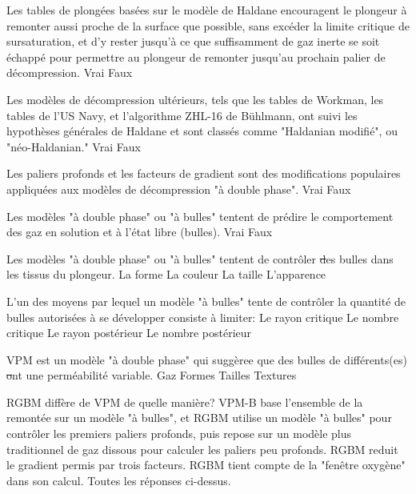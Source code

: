 \documentclass[english,10pt,a4paper,twoside]{article}
\begin{document}
	\begin{outline}

		\1 Les tables de plongées basées sur le modèle de Haldane encouragent le plongeur à remonter aussi proche de la surface que possible, sans excéder la limite critique de sursaturation, et d'y rester jusqu'à ce que suffisamment de gaz inerte se soit échappé pour permettre au plongeur de remonter jusqu'au prochain palier de décompression.
			\2 Vrai
			\2 Faux

		\1 Les modèles de décompression ultérieurs, tels que les tables de Workman, les tables de l'US Navy, et l'algorithme ZHL-16 de Bühlmann, ont suivi les hypothèses générales de Haldane et sont classés comme "Haldanian modifié", ou "néo-Haldanian."
			\2 Vrai
			\2 Faux

		\1 Les paliers profonds et les facteurs de gradient sont des modifications populaires appliquées aux modèles de décompression "à double phase".
			\2 Vrai
			\2 Faux

		\1 Les modèles "à double phase" ou "à bulles" tentent de prédire le comportement des gaz en solution et à l'état libre (bulles).
			\2 Vrai
			\2 Faux

		\1 Les modèles "à double phase" ou "à bulles" tentent de contrôler \st des bulles dans les tissus du plongeur.
			\2 La forme
			\2 La couleur
			\2 La taille
			\2 L'apparence

		\1 L'un des moyens par lequel un modèle "à bulles" tente de contrôler la quantité de bulles autorisées à se développer consiste à limiter:
			\2 Le rayon critique
			\2 Le nombre critique
			\2 Le rayon postérieur
			\2 Le nombre postérieur

		\1 VPM est un modèle "à double phase" qui suggèree que des bulles de différents(es) \st ont une perméabilité variable.
			\2 Gaz
			\2 Formes
			\2 Tailles
			\2 Textures

		\1 RGBM diffère de VPM de quelle manière?
			\2 VPM-B base l'ensemble de la remontée sur un modèle "à bulles", et RGBM utilise un modèle "à bulles" pour contrôler les premiers paliers profonds, puis repose sur un modèle plus traditionnel de gaz dissous pour calculer les paliers peu profonds.
			\2 RGBM reduit le gradient permis par trois facteurs.
			\2 RGBM tient compte de la "fenêtre oxygène" dans son calcul.
			\2 Toutes les réponses ci-dessus.
	\end{outline}
	\vfill
	\pagebreak

\end{document}
